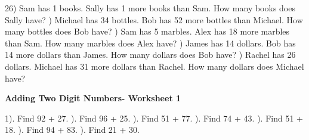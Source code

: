 \documentclass{article}%
\begin{document}
26) Sam has 1 books. Sally has 1 more books than Sam. How many books does Sally have?%
\newline%
\newline%
) Michael has 34 bottles. Bob has 52 more bottles than Michael. How many bottles does Bob have?%
\newline%
\newline%
) Sam has 5 marbles. Alex has 18 more marbles than Sam. How many marbles does Alex have?%
\newline%
\newline%
) James has 14 dollars. Bob has 14 more dollars than James. How many dollars does Bob have?%
\newline%
\newline%
) Rachel has 26 dollars. Michael has 31 more dollars than Rachel. How many dollars does Michael have?%
\newline%
\newline%
\newline%
\pagebreak%
\large%
\begin{center}%
\textbf{Adding Two Digit Numbers- Worksheet 1}%
\newline%
\newline%
\newline%
\end{center} \normalsize%
1). Find 92 + 27.%
\newline%
\newline%
). Find 96 + 25.%
\newline%
\newline%
). Find 51 + 77.%
\newline%
\newline%
). Find 74 + 43.%
\newline%
\newline%
). Find 51 + 18.%
\newline%
\newline%
). Find 94 + 83.%
\newline%
\newline%
). Find 21 + 30.%
\end{document}

